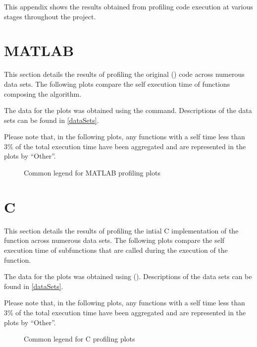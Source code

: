 This appendix shows the results obtained from profiling code execution at
various stages throughout the project.

\section{MATLAB}
\label{profiling:matlab}
This section details the results of profiling the original ()
code across numerous data sets. The following plots compare the self execution
time of functions composing the  algorithm.

The data for the plots was obtained using the 
 command. Descriptions of the data sets can be found in
\autoref{dataSets}.

Please note that, in the following plots, any functions with a self time less
than 3\% of the total execution time have been aggregated and are represented in
the plots by ``Other''.

\begin{figure}
    
    \caption{Common legend for MATLAB profiling plots}
    \label{profiling:matlab:legend}
\end{figure}



\section{C}
\label{profiling:c}
This section details the results of profiling the intial C implementation of the
 function across numerous data sets. The
following plots compare the self execution time of subfunctions that are called
during the execution of the  function.

The data for the plots was obtained using 
(). Descriptions of the data sets can be found in
\autoref{dataSets}.

Please note that, in the following plots, any functions with a self time less
than 3\% of the total execution time have been aggregated and are represented in
the plots by ``Other''.

\begin{figure}
    
    \caption{Common legend for C profiling plots}
    \label{profiling:c:legend}
\end{figure}

